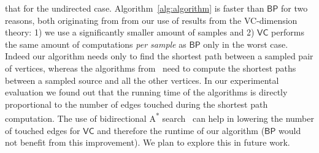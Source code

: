 that for the undirected case. %
 Algorithm~\ref{alg:algorithm} is faster than $\mathsf{BP}$ for two reasons, both
originating from from our use of results from the VC-dimension theory: 1) we use
a significantly smaller amount of samples and 2) $\mathsf{VC}$ performs the
same amount of computations \emph{per sample} as $\mathsf{BP}$ only in the worst
case. Indeed our algorithm needs only to find the shortest path between a
sampled pair of vertices, whereas the algorithms
from~\citep{GeisbergerSS08,BrandesP07} need to compute the shortest paths
between a sampled source and all the other vertices. In our experimental
evaluation we found out that the running time of the algorithms is directly
proportional to the number of edges touched during the shortest path
computation. The use of bidirectional A\textsuperscript{*}
search~\citep{Pohl69,KaindlK97} can help in lowering the number of touched edges
for $\mathsf{VC}$ and therefore the runtime of our algorithm ($\mathsf{BP}$
would not benefit from this improvement). We plan to explore this in future
work.


